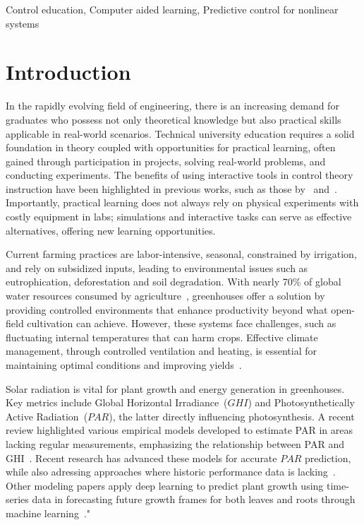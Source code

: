 \documentclass[conference]{IEEEtran}
\begin{document}
\begin{IEEEkeywords}
    Control education, Computer aided learning, Predictive control for nonlinear systems
\end{IEEEkeywords}

\section{Introduction}

In the rapidly evolving field of engineering, there is an increasing demand for graduates who possess not only theoretical knowledge but also practical skills applicable in real-world scenarios. Technical university education requires a solid foundation in theory coupled with opportunities for practical learning, often gained through participation in projects, solving real-world problems, and conducting experiments. The benefits of using interactive tools in control theory instruction have been highlighted in previous works, such as those by~\cite{Emami1991} and~\cite{Guzman2013}. Importantly, practical learning does not always rely on physical experiments with costly equipment in labs; simulations and interactive tasks can serve as effective alternatives, offering new learning opportunities.

Current farming practices are labor-intensive, seasonal, constrained by irrigation, and rely on subsidized inputs, leading to environmental issues such as eutrophication, deforestation and soil degradation. With nearly 70\% of global water resources consumed by agriculture~\cite{Debroy2024}, greenhouses offer a solution by providing controlled environments that enhance productivity beyond what open-field cultivation can achieve. However, these systems face challenges, such as fluctuating internal temperatures that can harm crops. Effective climate management, through controlled ventilation and heating, is essential for maintaining optimal conditions and improving yields~\cite{Wu2019}.

Solar radiation is vital for plant growth and energy generation in greenhouses. Key metrics include Global Horizontal Irradiance~(\(GHI\)) and Photosynthetically Active Radiation~(\(PAR\)), the latter directly influencing photosynthesis. A recent review highlighted various empirical models developed to estimate PAR in areas lacking regular measurements, emphasizing the relationship between PAR and GHI~\citep{NoriegaGardea2021}. Recent research has advanced these models for accurate \(PAR\) prediction, while also adressing approaches where historic performance data is lacking~\cite{Iddio2020, MaLu2022}. Other modeling papers apply deep learning to predict plant growth using time-series data in forecasting future growth frames for both leaves and roots through machine learning~\cite{rs13030331}."
\end{document}
